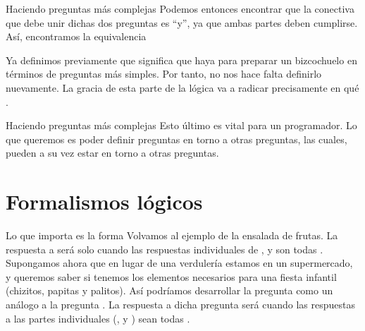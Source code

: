 
\begin{frame}{Haciendo preguntas más complejas}
  Podemos entonces encontrar que la conectiva que debe unir dichas dos preguntas
  es ``y'', ya que ambas partes deben cumplirse. Así, encontramos la equivalencia
  \jump
  \centerline{}
  \centerline{}
  \centerline{}
  \jump
  Ya definimos previamente que significa que haya para preparar un bizcochuelo
  en términos de preguntas más simples. Por tanto, no nos hace falta definirlo
  nuevamente.
  \jump
  La gracia de esta parte de la lógica va a radicar precisamente en qué
  .
\end{frame}


\begin{frame}{Haciendo preguntas más complejas}
  Esto último es vital para un programador.
  \jump
  Lo que queremos es poder definir preguntas en torno a otras preguntas, las
  cuales, pueden a su vez estar en torno a otras preguntas.
\end{frame}


\section{Formalismos lógicos}


\begin{frame}{Lo que importa es la forma}
  Volvamos al ejemplo de la ensalada de frutas. La respuesta a
   será \fulltrue
  solo cuando las respuestas individuales de ,
   y  son todas \fulltrue.
  \jump
  Supongamos ahora que en lugar de una verdulería estamos en un supermercado,
  y queremos saber si tenemos los elementos necesarios para una fiesta infantil
  (chizitos, papitas y palitos).
  \jump
  Así podríamos desarrollar la pregunta 
  como un análogo a la pregunta .
  \jump
  La respuesta a dicha pregunta será \fulltrue cuando las respuestas a las partes
  individuales (,  y
  ) sean todas \fulltrue.
\end{frame}

